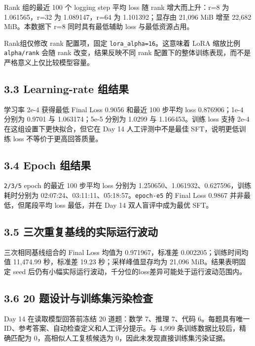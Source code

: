 \documentclass[UTF8,fontset=fandol,a4paper,11pt]{ctexart}
\begin{document}
Rank 组的最近 100 个 logging step 平均 loss 随 rank 增大而上升：r=8 为
1.061565，r=32 为 1.089147，r=64 为 1.101392；显存由 21,096 MiB 增至
22,682 MiB。本数据下 r=8 同时具有最低辅助 loss 与最低资源占用。

Rank组仅修改 rank 配置项，固定 \nolinkurl{lora_alpha=16}。这意味着 LoRA
缩放比例 \nolinkurl{alpha/rank} 会随 rank 改变，结果反映不同 rank
配置下的整体训练表现，而不是严格意义上仅比较模型容量。

\subsection{3.3 Learning-rate 组结果}\label{learning-rate-ux7ec4ux7ed3ux679c}

学习率 2e-4 获得最低 Final Loss 0.9056 和最近 100 步平均 loss
0.876906；1e-4 分别为 0.9701 与 1.063174；5e-5 分别为 1.0299 与
1.166453。训练 loss 支持 2e-4 在这组设置下更快拟合，但它在 Day 14
人工评测中不是最佳 SFT，说明更低训练 loss 不等价于更高回答质量。

\subsection{3.4 Epoch 组结果}\label{epoch-ux7ec4ux7ed3ux679c}

{\nolinkurl{2/3/5}} epoch 的最近 100 步平均 loss 分别为
1.250650、1.061932、0.627596，训练耗时分别为
02:07:24、03:11:11、05:18:57。\nolinkurl{epoch-e5} 的 Final Loss 0.9867
并非最低，但尾段平均 loss 最低，并在 Day 14 双人盲评中成为最优 SFT。

\subsection{3.5 三次重复基线的实际运行波动}\label{ux4e09ux6b21ux91cdux590dux57faux7ebfux7684ux5b9eux9645ux8fd0ux884cux6ce2ux52a8}

三次相同基线组合的 Final Loss 均值为 0.971967，标准差
0.002205；训练时间均值 11,474.99 秒，标准差 19.23 秒；采样峰值显存均为
21,096 MiB。结果表明固定 seed
后仍有小幅实际运行波动，千分位的loss差异可能处于运行波动范围内。

\subsection{3.6 20 题设计与训练集污染检查}\label{ux9898ux8bbeux8ba1ux4e0eux8badux7ec3ux96c6ux6c61ux67d3ux68c0ux67e5}

Day 14 在读取模型回答前冻结 20 道题：数学 7、推理 7、代码
6。每题具有唯一 ID、参考答案、自动检查定义和人工评分提示。与 4,999
条训练数据比较后，精确匹配为 0，高相似人工复核候选为
0，因此未发现直接训练集污染证据。
\end{document}
